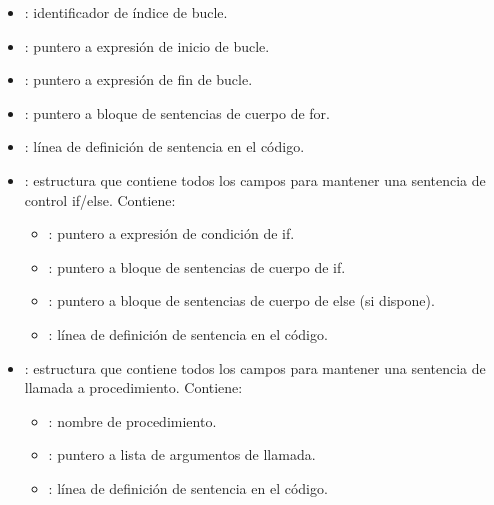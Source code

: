 \begin{itemize}
\begin{itemize}
        \begin{itemize}
            \item {}: identificador de índice de bucle.
            \item {}: puntero a expresión de inicio de bucle.
            \item {}: puntero a expresión de fin de bucle.
            \item {}: puntero a bloque de sentencias de cuerpo de for.
            \item {} : línea de definición de sentencia en el código.
        \end{itemize}
    \end{itemize}
    \begin{itemize}
        \item {} : estructura que contiene todos los campos para mantener una sentencia de control if/else. Contiene:
        \begin{itemize}
            \item {}: puntero a expresión de condición de if.
            \item {}: puntero a bloque de sentencias de cuerpo de if.
            \item {}: puntero a bloque de sentencias de cuerpo de else (si dispone).
            \item {} : línea de definición de sentencia en el código.
        \end{itemize}
    \end{itemize}
    \begin{itemize}
        \item {} : estructura que contiene todos los campos para mantener una sentencia de llamada a procedimiento. Contiene:
        \begin{itemize}
            \item {}: nombre de procedimiento.
            \item {}: puntero a lista de argumentos de llamada.
            \item {} : línea de definición de sentencia en el código.
        \end{itemize}
    \end{itemize}
    \begin{itemize}

\end{itemize}
\end{itemize}

